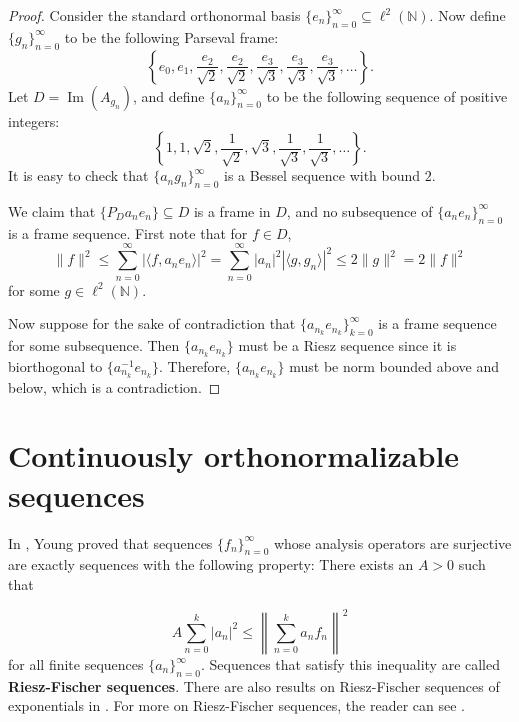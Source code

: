 \documentclass[11pt]{amsart}
\theoremstyle{definition}
\numberwithin{equation}{section}
\begin{document}
\begin{proof}
Consider the standard orthonormal basis $\{e_n\}_{n=0}^{\infty}\subseteq \ell^{2}(\mathbb{N})$. Now define $\{g_n\}_{n=0}^{\infty}$ to be the following Parseval frame:
$$\left\{e_0, e_1, \frac{e_2}{\sqrt{2}},\frac{e_2}{\sqrt{2}}, \frac{e_3}{\sqrt{3}},\frac{e_3}{\sqrt{3}},\frac{e_3}{\sqrt{3}},\dots \right\}.$$ Let $D=\operatorname{Im}(A_{g_n})$, and define $\{a_n\}_{n=0}^{\infty}$ to be the following sequence of positive integers:
$$\left\{1, 1, \sqrt{2}, \frac{1}{\sqrt{2}}, \sqrt{3}, \frac{1}{\sqrt{3}},\frac{1}{\sqrt{3}},\dots \right\}.$$ It is easy to check that $\{a_ng_n\}_{n=0}^{\infty}$ is a Bessel sequence with bound $2$.

We claim that $\{P_{D}a_ne_n\}\subseteq D$ is a frame in $D$, and no subsequence of $\{a_ne_n\}_{n=0}^{\infty}$ is a frame sequence. First note that for $f\in D$,
$$\|f\|^2\leq \sum_{n=0}^{\infty}|\langle f, a_ne_n\rangle|^{2}=\sum_{n=0}^{\infty}|a_n|^{2}|\langle g, g_n\rangle|^{2}\leq 2\|g\|^{2} =2\|f\|^{2}$$ for some $g\in \ell^{2}(\mathbb{N})$.

Now suppose for the sake of contradiction that $\{a_{n_k}e_{n_k}\}_{k=0}^{\infty}$ is a frame sequence for some subsequence. Then $\{a_{n_k}e_{n_k}\}$ must be a Riesz sequence since it is biorthogonal to $\{a_{n_k}^{-1}e_{n_k}\}$. Therefore, $\{a_{n_k}e_{n_k}\}$ must be norm bounded above and below, which is a contradiction.
\end{proof}

\section{Continuously orthonormalizable sequences}\label{4}

In \cite{Young2001Introduction}, Young proved that sequences $\{f_n\}_{n=0}^{\infty}$ whose analysis operators are surjective are exactly sequences with the following property: There exists an $A>0$ such that

$$A \sum_{n=0}^{k}|a_n|^2 \leq \left\| \sum_{n=0}^{k} a_n f_n  \right\|^2$$
for all finite sequences $\{a_n\}_{n=0}^{\infty}$. Sequences that satisfy this inequality are called \textbf{Riesz-Fischer sequences}. There are also results on Riesz-Fischer sequences of exponentials in \cite{Reid1995Class}. For more on Riesz-Fischer sequences, the reader can see \cite{Casazza2002Riesz-Fischer, Young1998Class}.
\end{document}
